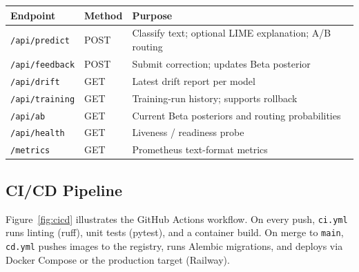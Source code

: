 \documentclass[11pt, a4paper]{article}
\begin{document}
\begin{center}\small
\begin{tabular}{@{}lll@{}}
\toprule
\textbf{Endpoint} & \textbf{Method} & \textbf{Purpose} \\
\midrule
\texttt{/api/predict}       & POST & Classify text; optional LIME explanation; A/B routing \\
\texttt{/api/feedback}      & POST & Submit correction; updates Beta posterior \\
\texttt{/api/drift}         & GET  & Latest drift report per model \\
\texttt{/api/training}      & GET  & Training-run history; supports rollback \\
\texttt{/api/ab}            & GET  & Current Beta posteriors and routing probabilities \\
\texttt{/api/health}        & GET  & Liveness / readiness probe \\
\texttt{/metrics}           & GET  & Prometheus text-format metrics \\
\bottomrule
\end{tabular}
\end{center}

\subsection{CI/CD Pipeline}
Figure~\ref{fig:cicd} illustrates the GitHub Actions workflow. On every push, \texttt{ci.yml} runs linting (ruff), unit tests (pytest), and a container build. On merge to \texttt{main}, \texttt{cd.yml} pushes images to the registry, runs Alembic migrations, and deploys via Docker Compose or the production target (Railway).
\end{document}
